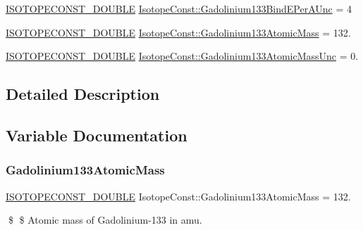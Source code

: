 \begin{DoxyCompactItemize}
\mbox{\hyperlink{group___isotope_const-_macros_ga8f45a7272ce02c0b4c65c44636ed719a}{I\+S\+O\+T\+O\+P\+E\+C\+O\+N\+S\+T\+\_\+\+D\+O\+U\+B\+LE}} \mbox{\hyperlink{group___isotope_const-_gadolinium-_gd133_ga9b9be69b1d98e66d9d10f66fcd46185d}{Isotope\+Const\+::\+Gadolinium133\+Bind\+E\+Per\+A\+Unc}} = 4
\item 
\mbox{\hyperlink{group___isotope_const-_macros_ga8f45a7272ce02c0b4c65c44636ed719a}{I\+S\+O\+T\+O\+P\+E\+C\+O\+N\+S\+T\+\_\+\+D\+O\+U\+B\+LE}} \mbox{\hyperlink{group___isotope_const-_gadolinium-_gd133_gaca29be4ea31e79cd5610dccb87fcf4f5}{Isotope\+Const\+::\+Gadolinium133\+Atomic\+Mass}} = 132.
\item 
\mbox{\hyperlink{group___isotope_const-_macros_ga8f45a7272ce02c0b4c65c44636ed719a}{I\+S\+O\+T\+O\+P\+E\+C\+O\+N\+S\+T\+\_\+\+D\+O\+U\+B\+LE}} \mbox{\hyperlink{group___isotope_const-_gadolinium-_gd133_ga17006d78d0c0e09bffdc703c7d8733f3}{Isotope\+Const\+::\+Gadolinium133\+Atomic\+Mass\+Unc}} = 0.
\end{DoxyCompactItemize}


\subsection{Detailed Description}


\subsection{Variable Documentation}
\mbox{\label{group___isotope_const-_gadolinium-_gd133_gaca29be4ea31e79cd5610dccb87fcf4f5}} 
\subsubsection{\texorpdfstring{Gadolinium133\+Atomic\+Mass}{Gadolinium133AtomicMass}}
{\footnotesize\ttfamily \mbox{\hyperlink{group___isotope_const-_macros_ga8f45a7272ce02c0b4c65c44636ed719a}{I\+S\+O\+T\+O\+P\+E\+C\+O\+N\+S\+T\+\_\+\+D\+O\+U\+B\+LE}} Isotope\+Const\+::\+Gadolinium133\+Atomic\+Mass = 132.}

\$ \$ Atomic mass of Gadolinium-\/133 in amu. \mbox{\label{group___isotope_const-_gadolinium-_gd133_ga17006d78d0c0e09bffdc703c7d8733f3}} 
